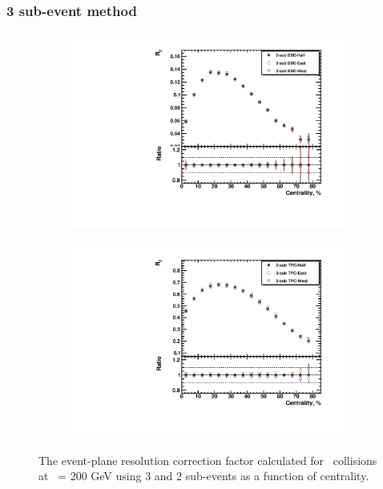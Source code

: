 \FloatBarrier
\subsubsection{3 sub-event method}

\begin{figure}[ht]
    \begin{subfigure}{.49\textwidth}
        \centering
        \includegraphics[width=1.\linewidth]{Figures/c_Res3sub2.pdf}
    \end{subfigure}
    \begin{subfigure}{.49\textwidth}
        \centering
        \includegraphics[width=1.\linewidth]{Figures/c_Res3sub3.pdf}
    \end{subfigure}
    \label{fig:Res_3sub}
    \caption{The event-plane resolution correction factor calculated for \AuAu\ collisions at \sNN\ = 200 GeV using 3 and 2 sub-events as a function of centrality.}
\end{figure}